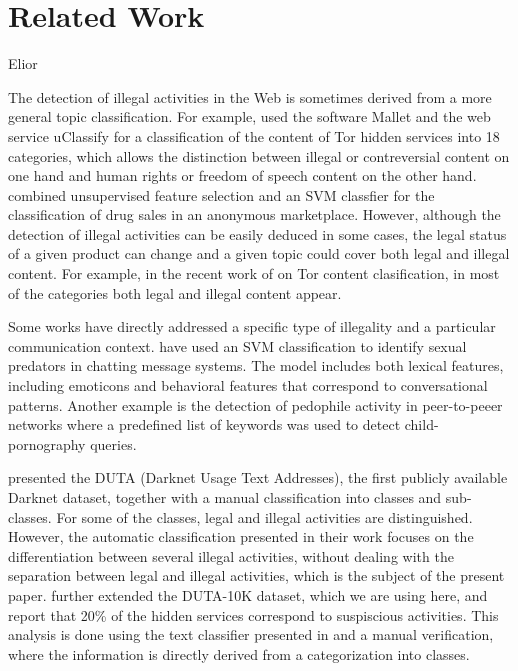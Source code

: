 \documentclass[11pt,a4paper]{article}
\begin{document}
\section{Related Work}

Elior


The detection of illegal activities in the Web is sometimes derived from a more general topic classification. For example, \citet{Biryukov14} used the software Mallet \citep{McCallum02} and the web service uClassify \citep{Kagstrom13} for a classification of the content of Tor hidden services into 18 categories, which allows the distinction between illegal or contreversial content on one hand and human rights or freedom of speech content on the other hand. \citet{GraczykKinningham15} combined unsupervised feature selection and an SVM classfier for the classification of drug sales in an anonymous marketplace. However, although the detection of illegal activities can be easily deduced in some cases, the legal status of a given product can change \citep{GraczykKinningham15} and a given topic could cover both legal and illegal content. For example, in the recent work of \citet{Avarikioti18} on Tor content clasification, in most of the categories both legal and illegal content appear.

Some works have directly addressed a specific type of illegality and a particular communication context. \citet{MorrisHirst12} have used an SVM classification to identify sexual predators in chatting message systems. The model includes both lexical features, including emoticons and behavioral features that correspond to conversational patterns. Another example is the detection of pedophile activity in peer-to-peeer networks \citep{Latapy13} where a predefined list of keywords was used to detect child-pornography queries.

\citet{AlNabki17} presented the DUTA (Darknet Usage Text Addresses), the first publicly available Darknet dataset, together with a manual classification into classes and sub-classes. For some of the classes, legal and illegal activities are distinguished. However, the automatic classification presented in their work focuses on the differentiation between several illegal activities, without dealing with the separation between legal and illegal activities, which is the subject of the present paper. \citet{AlNabki19} further extended the DUTA-10K dataset, which we are using here, and report that 20\% of the hidden services correspond to suspiscious activities. This analysis is done using the text classifier presented in \citet{AlNabki17} and a manual verification, where the information is directly derived from a categorization into classes.
\end{document}
